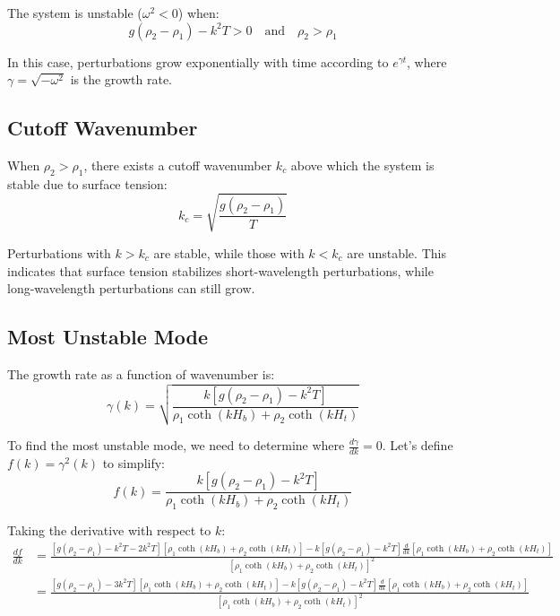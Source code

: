 \documentclass[12pt,a4paper]{article}
\begin{document}
The system is unstable ($\omega^2 < 0$) when:
\begin{equation}
g(\rho_2 - \rho_1) - k^2T > 0 \quad \text{and} \quad \rho_2 > \rho_1
\end{equation}

In this case, perturbations grow exponentially with time according to $e^{\gamma t}$, where $\gamma = \sqrt{-\omega^2}$ is the growth rate.

\subsection{Cutoff Wavenumber}
When $\rho_2 > \rho_1$, there exists a cutoff wavenumber $k_c$ above which the system is stable due to surface tension:
\begin{equation}
k_c = \sqrt{\frac{g(\rho_2 - \rho_1)}{T}}
\end{equation}

Perturbations with $k > k_c$ are stable, while those with $k < k_c$ are unstable. This indicates that surface tension stabilizes short-wavelength perturbations, while long-wavelength perturbations can still grow.

\subsection{Most Unstable Mode}
The growth rate as a function of wavenumber is:
\begin{equation}
\gamma(k) = \sqrt{\frac{k[g(\rho_2 - \rho_1) - k^2T]}{\rho_1\coth(kH_b) + \rho_2\coth(kH_t)}}
\end{equation}

To find the most unstable mode, we need to determine where $\frac{d\gamma}{dk} = 0$. Let's define $f(k) = \gamma^2(k)$ to simplify:
\begin{equation}
f(k) = \frac{k[g(\rho_2 - \rho_1) - k^2T]}{\rho_1\coth(kH_b) + \rho_2\coth(kH_t)}
\end{equation}

Taking the derivative with respect to $k$:
\begin{align}
\frac{df}{dk} &= \frac{[g(\rho_2 - \rho_1) - k^2T - 2k^2T][\rho_1\coth(kH_b) + \rho_2\coth(kH_t)] - k[g(\rho_2 - \rho_1) - k^2T]\frac{d}{dk}[\rho_1\coth(kH_b) + \rho_2\coth(kH_t)]}{[\rho_1\coth(kH_b) + \rho_2\coth(kH_t)]^2} \\
&= \frac{[g(\rho_2 - \rho_1) - 3k^2T][\rho_1\coth(kH_b) + \rho_2\coth(kH_t)] - k[g(\rho_2 - \rho_1) - k^2T]\frac{d}{dk}[\rho_1\coth(kH_b) + \rho_2\coth(kH_t)]}{[\rho_1\coth(kH_b) + \rho_2\coth(kH_t)]^2}
\end{align}
\end{document}
